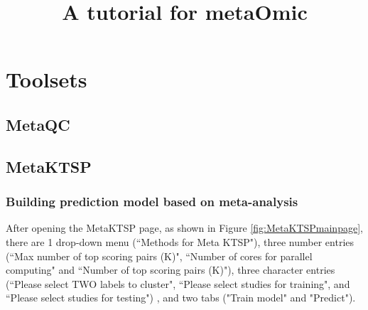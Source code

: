 \documentclass{article}
\title{A tutorial for metaOmic}
\author{}
\date{ }
\begin{document}
 
\maketitle
 
\tableofcontents
 
 
 
 
 
\section{Toolsets}
\subsection{MetaQC}

 
 
 
 

\subsection{MetaKTSP}
\subsubsection{Building prediction model based on meta-analysis}

After opening the MetaKTSP page, as shown in Figure \ref{fig:MetaKTSPmainpage}, there are 1 drop-down menu (``Methods for Meta KTSP"), three number entries (``Max number of top scoring pairs (K)", ``Number of cores for parallel computing" and ``Number of top scoring pairs (K)"), three character entries (``Please select TWO labels to cluster", ``Please select studies for training", and ``Please select studies for testing") , and two tabs ("Train model" and "Predict"). 
\end{document}
